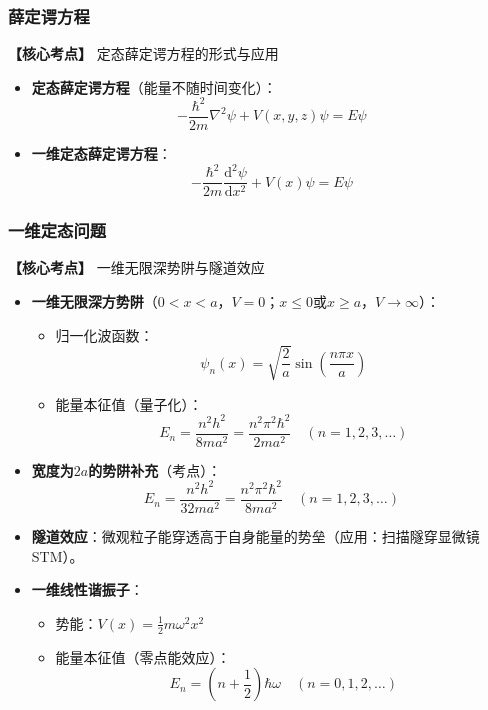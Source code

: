 \subsubsection{薛定谔方程}
\textbf{【核心考点】} 定态薛定谔方程的形式与应用 \par\vspace{0.3em}
\begin{itemize}
    \item \textbf{定态薛定谔方程}（能量不随时间变化）：
          \[
          -\frac{\hbar^2}{2m}\nabla^2 \psi + V(x,y,z)\psi = E\psi
          \]
    \item \textbf{一维定态薛定谔方程}：
          \[
          -\frac{\hbar^2}{2m}\frac{\mathrm{d}^2\psi}{\mathrm{d}x^2} + V(x)\psi = E\psi
          \]
\end{itemize}
\vspace{0.5em}

\subsubsection{一维定态问题}
\textbf{【核心考点】} 一维无限深势阱与隧道效应 \par\vspace{0.3em}
\begin{itemize}
    \item \textbf{一维无限深方势阱}（$0 < x < a$，$V=0$；$x\le0$或$x\ge a$，$V\to\infty$）：
          \begin{itemize}
              \item 归一化波函数：
                    \[
                    \psi_n(x) = \sqrt{\frac{2}{a}} \sin\left(\frac{n\pi x}{a}\right)
                    \]
              \item 能量本征值（量子化）：
                    \[
                    E_n = \frac{n^2 h^2}{8ma^2} = \frac{n^2 \pi^2 \hbar^2}{2ma^2}\quad (n=1,2,3,\dots)
                    \]
          \end{itemize}
    \item \textbf{宽度为$2a$的势阱补充}（考点）：
          \[
          E_n = \frac{n^2 h^2}{32ma^2} = \frac{n^2 \pi^2 \hbar^2}{8ma^2}\quad (n=1,2,3,\dots)
          \]
    \item \textbf{隧道效应}：微观粒子能穿透高于自身能量的势垒（应用：扫描隧穿显微镜STM）。
    \item \textbf{一维线性谐振子}：
          \begin{itemize}
              \item 势能：$V(x) = \frac{1}{2}m\omega^2 x^2$
              \item 能量本征值（零点能效应）：
                    \[
                    E_n = \left(n + \frac{1}{2}\right)\hbar\omega\quad (n=0,1,2,\dots)
                    \]
          \end{itemize}
\end{itemize}
\vspace{0.5em}

